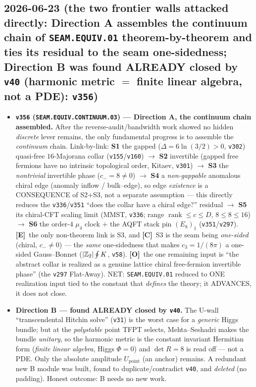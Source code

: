 \documentclass[11pt]{article}
\providecommand{\mE}{\textbf{[E]}}\providecommand{\mC}{\textbf{[C]}}
\providecommand{\mO}{\textbf{[O]}}\providecommand{\mX}{\textbf{[X]}}
\providecommand{\vref}[1]{\texttt{#1}}
\providecommand{\cthree}{c_3}\providecommand{\phiz}{\varphi_0^{\mathrm{ret}}}
\begin{document}
\subsection*{2026-06-23 (the two frontier walls attacked directly: Direction A assembles the continuum chain of \texttt{SEAM.EQUIV.01} theorem-by-theorem and ties its residual to the seam one-sidedness; Direction B was found ALREADY closed by \texttt{v40} (harmonic metric $=$ finite linear algebra, not a PDE): \texttt{v356})}
\begin{itemize}
\item \textbf{\texttt{v356} (\texttt{SEAM.EQUIV.CONTINUUM.03}) --- Direction A, the continuum chain assembled.} After the
reverse-audit/bandwidth work showed no hidden \emph{discrete} lever remains, the only fundamental progress is to
assemble the \emph{continuum} chain. Link-by-link: \textbf{S1} the gapped ($\Delta{=}6\ln(3/2){>}0$, \vref{v302})
quasi-free $16$-Majorana collar (\vref{v155}/\vref{v160}) $\to$ \textbf{S2} invertible (gapped free fermions have no
intrinsic topological order, Kitaev, \vref{v301}) $\to$ \textbf{S3} the \emph{nontrivial} invertible phase
($c_-{=}8{\neq}0$) $\to$ \textbf{S4} a \emph{non-gappable} anomalous chiral edge (anomaly inflow / bulk--edge), so
edge \emph{existence} is a CONSEQUENCE of S2$+$S3, not a separate assumption --- this directly reduces the
\vref{v336}/\vref{v351} ``does the collar have a chiral edge?'' residual $\to$ \textbf{S5} its chiral-CFT scaling limit
(MMST, \vref{v336}; range $\operatorname{rank}\le c\le D$, $8\le8\le16$) $\to$ \textbf{S6} the order-$4$ $\mu_4$ clock
$+$ the AQFT stack pin $(E_8)_1$ (\vref{v351}/\vref{v297}). \mE\ the only non-theorem link is S3, and \mC\ S3 is the
seam being \emph{one-sided} (chiral, $c_-{\neq}0$) --- the \emph{same} one-sidedness that makes $\cthree{=}1/(8\pi)$ a
one-sided Gauss--Bonnet ($|\mathbb{Z}_2|\oint K$, \vref{v58}). \mO\ the one remaining input is ``the abstract collar is
realized as a genuine lattice chiral free-fermion invertible phase'' (the \vref{v297} Flat-Away). NET: \texttt{SEAM.EQUIV.01}
reduced to ONE realization input tied to the constant that \emph{defines} the theory; it ADVANCES, it does not close.
\item \textbf{Direction B --- found ALREADY closed by \vref{v40}.} The U-wall ``transcendental Hitchin solve'' (\vref{v31})
is the worst case for a \emph{generic} Higgs bundle; but at the \emph{polystable} point TFPT selects, Mehta--Seshadri
makes the bundle \emph{unitary}, so the harmonic metric is the constant invariant Hermitian form (\emph{finite linear
algebra}, Higgs $\Phi{=}0$) and $\det R{=}8$ is read off --- not a PDE. Only the absolute amplitude $U_{\mathrm{point}}$
(an anchor) remains. A redundant new B module was built, found to duplicate/contradict \vref{v40}, and \emph{deleted}
(no padding). Honest outcome: B needs no new work.
\end{itemize}
\end{document}
